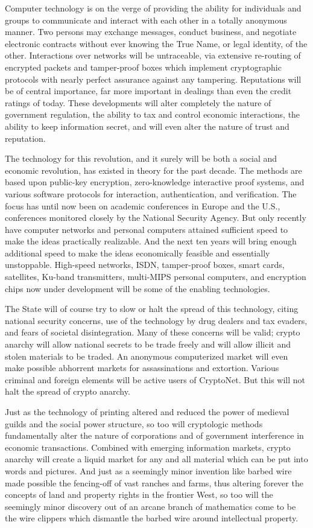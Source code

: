 \documentclass[letterpaper,12pt,english]{sphinxmanual}
\begin{document}
Computer technology is on the verge of providing the ability for individuals and groups to communicate and interact with each other in a totally anonymous manner. Two persons may exchange messages, conduct business, and negotiate electronic contracts without ever knowing the True Name, or legal identity, of the other. Interactions over networks will be untraceable, via extensive re-routing of encrypted packets and tamper-proof boxes which implement cryptographic protocols with nearly perfect assurance against any tampering. Reputations will be of central importance, far more important in dealings than even the credit ratings of today. These developments will alter completely the nature of government regulation, the ability to tax and control economic interactions, the ability to keep information secret, and will even alter the nature of trust and reputation.

The technology for this revolution, and it surely will be both a social and economic revolution, has existed in theory for the past decade. The methods are based upon public-key encryption, zero-knowledge interactive proof systems, and various software protocols for interaction, authentication, and verification. The focus has until now been on academic conferences in Europe and the U.S., conferences monitored closely by the National Security Agency. But only recently have computer networks and personal computers attained sufficient speed to make the ideas practically realizable. And the next ten years will bring enough additional speed to make the ideas economically feasible and essentially unstoppable. High-speed networks, ISDN, tamper-proof boxes, smart cards, satellites, Ku-band transmitters, multi-MIPS personal computers, and encryption chips now under development will be some of the enabling technologies.

The State will of course try to slow or halt the spread of this technology, citing national security concerns, use of the technology by drug dealers and tax evaders, and fears of societal disintegration. Many of these concerns will be valid; crypto anarchy will allow national secrets to be trade freely and will allow illicit and stolen materials to be traded. An anonymous computerized market will even make possible abhorrent markets for assassinations and extortion. Various criminal and foreign elements will be active users of CryptoNet. But this will not halt the spread of crypto anarchy.

Just as the technology of printing altered and reduced the power of medieval guilds and the social power structure, so too will cryptologic methods fundamentally alter the nature of corporations and of government interference in economic transactions. Combined with emerging information markets, crypto anarchy will create a liquid market for any and all material which can be put into words and pictures. And just as a seemingly minor invention like barbed wire made possible the fencing-off of vast ranches and farms, thus altering forever the concepts of land and property rights in the frontier West, so too will the seemingly minor discovery out of an arcane branch of mathematics come to be the wire clippers which dismantle the barbed wire around intellectual property.
\end{document}
